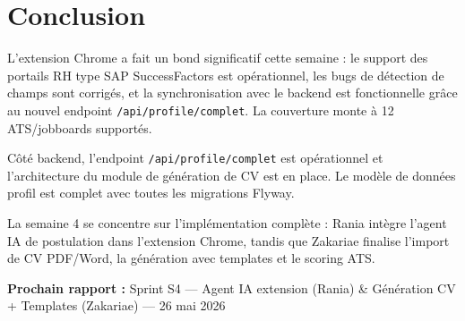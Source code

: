\documentclass[11pt,a4paper]{article}
\begin{document}
\section{Conclusion}

L'extension Chrome a fait un bond significatif cette semaine : le support des portails RH type SAP SuccessFactors est op\'erationnel, les bugs de d\'etection de champs sont corrig\'es, et la synchronisation avec le backend est fonctionnelle gr\^ace au nouvel endpoint \texttt{/api/profile/complet}. La couverture monte \`a 12 ATS/jobboards support\'es.

C\^ot\'e backend, l'endpoint \texttt{/api/profile/complet} est op\'erationnel et l'architecture du module de g\'en\'eration de CV est en place. Le mod\`ele de donn\'ees profil est complet avec toutes les migrations Flyway.

La semaine 4 se concentre sur l'impl\'ementation compl\`ete : Rania int\`egre l'agent IA de postulation dans l'extension Chrome, tandis que Zakariae finalise l'import de CV PDF/Word, la g\'en\'eration avec templates et le scoring ATS.

\vspace{1em}

\begin{tcolorbox}[
  colback=techbg, colframe=accentblue,
  arc=3pt, left=8pt, right=8pt, top=6pt, bottom=6pt
]
\textbf{Prochain rapport :} Sprint S4 --- Agent IA extension (Rania) \& G\'en\'eration CV + Templates (Zakariae) --- 26 mai 2026
\end{tcolorbox}
\end{document}
